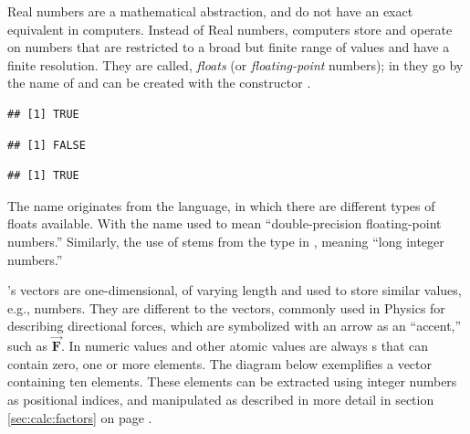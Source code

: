 \documentclass[krantz2]{krantz}\usepackage{knitr}
\begin{document}
\begin{explainbox}
Real numbers are a mathematical abstraction, and do not have an exact equivalent in computers. Instead of Real numbers, computers store and operate on numbers that are restricted to a broad but finite range of values and have a finite resolution. They are called, \emph{floats} (or \emph{floating-point} numbers); in \Rlang they go by the name of  and can be created with the constructor .

\begin{knitrout}\footnotesize
{}\color{fgcolor}\begin{kframe}
\begin{alltt}
\hlstd{(}\hlstd{)}
\end{alltt}
\begin{verbatim}
## [1] TRUE
\end{verbatim}
\begin{alltt}
\hlstd{(}\hlstd{)}
\end{alltt}
\begin{verbatim}
## [1] FALSE
\end{verbatim}
\begin{alltt}
\hlstd{(}\hlstd{)}
\end{alltt}
\begin{verbatim}
## [1] TRUE
\end{verbatim}
\end{kframe}
\end{knitrout}

The name  originates from the \Clang language, in which there are different types of floats available. With the name  used to mean ``double-precision floating-point numbers.'' Similarly, the use of  stems from the  type in \Clang, meaning ``long integer numbers.''
\end{explainbox}

\label{par:calc:vectors:diag}
\Rlang's vectors\label{par:numeric:vectors:start} are one-dimensional, of varying length and used to store similar values, e.g., numbers. They are different to the vectors, commonly used in Physics for describing directional forces, which are symbolized with an arrow as an ``accent,'' such as $\overrightarrow{\mathbf{F}}$. In \Rlang numeric values and other atomic values are always s that can contain zero, one or more elements. The diagram below exemplifies a vector containing ten elements. These elements can be extracted using integer numbers as positional indices, and manipulated as described in more detail in section \ref{sec:calc:factors} on page \pageref{sec:calc:factors}.\vspace{1ex}
\end{document}
